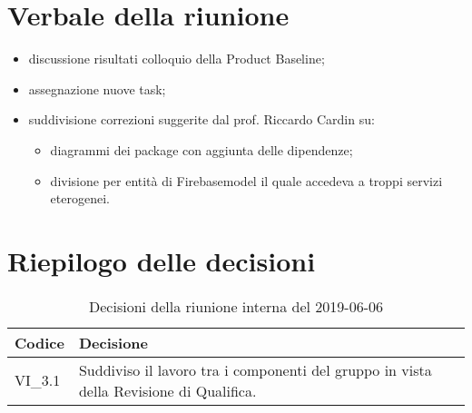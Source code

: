\section{Verbale della riunione}
\begin{itemize}
	\item discussione risultati colloquio della Product Baseline\glo;
	\item assegnazione nuove task;
	\item suddivisione correzioni suggerite dal prof. Riccardo Cardin su:
	\begin{itemize}
		\item diagrammi dei package con aggiunta delle dipendenze;
		\item divisione per entità di Firebase\glosp model il quale accedeva a troppi servizi eterogenei.
	\end{itemize}

\end{itemize} 

\section{Riepilogo delle decisioni}

	
	\begin{longtable}{ >{\centering}p{} >{}p{}}
		\caption{Decisioni della riunione interna del 2019-06-06}\\	
		\rowcolorhead
		\textbf{\color{white}Codice} 
		& \centering\textbf{\color{white}Decisione} 
		\tabularnewline 
		\endfirsthead
		VI\_3.1 & Suddiviso il lavoro tra i componenti del gruppo in vista della Revisione di Qualifica.
		
	\end{longtable}
	




